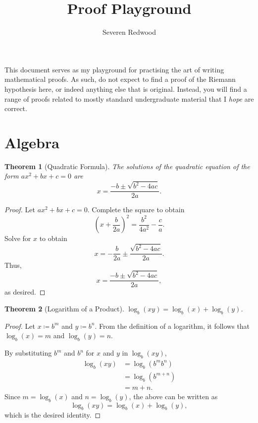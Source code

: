 \documentclass[headings=standardclasses]{scrartcl}
\title{Proof Playground}
\author{Severen Redwood}
\date{}
\newtheorem{theorem}{Theorem}[subsection]
\theoremstyle{definition}
\begin{document}
\maketitle

\noindent This document serves as my playground for practising the art of
writing mathematical proofs. As such, do not expect to find a proof of the
Riemann hypothesis here, or indeed anything else that is original. Instead, you
will find a range of proofs related to mostly standard undergraduate material
that I \textit{hope} are correct.

\tableofcontents

\section{Algebra}

\begin{theorem}[Quadratic Formula]
  The solutions of the quadratic equation of the form \(ax^2 + bx + c = 0\) are
  \[ x = \frac{-b ±\sqrt{b^2 - 4ac}}{2a}. \]
\end{theorem}

\begin{proof}
  Let \(ax^{2} + bx + c = 0\). Complete the square to obtain
  \begin{equation*}
    {\left(x + \frac{b}{2a}\right)}^2 = \frac{b^{2}}{4a^{2}} - \frac{c}{a}.
  \end{equation*}
  Solve for \(x\) to obtain
  \begin{equation*}
    x = -\frac{b}{2a} ±\frac{\sqrt{b^2 - 4ac}}{2a}.
  \end{equation*}
  Thus,
  \begin{equation*}
    x = \frac{-b ± \sqrt{b^2 - 4ac}}{2a},
  \end{equation*}
  as desired.
\end{proof}

\begin{theorem}[Logarithm of a Product]
  \(\displaystyle \log_{b}(xy) = \log_{b}(x) + \log_{b}(y)\).
\end{theorem}

\begin{proof}
  Let \(x ≔ b^m\) and \(y ≔ b^n\). From the definition of a logarithm, it
  follows that \(\log_b(x) = m\) and \(\log_b(y) = n\).

  By substituting \(b^m\) and \(b^n\) for \(x\) and \(y\) in \(\log_b(xy)\),
  \begin{equation*}
  \begin{split}
    \log_b(xy) &= \log_b(b^{m}b^{n}) \\
               &= \log_b(b^{m + n}) \\
               &= m + n.
  \end{split}
  \end{equation*}
  Since \(m = \log_b(x)\) and \(n = \log_b(y)\), the above can be written as
  \begin{equation*}
    \log_b(xy) = \log_b(x) + \log_b(y),
  \end{equation*}
  which is the desired identity.
\end{proof}
\end{document}
